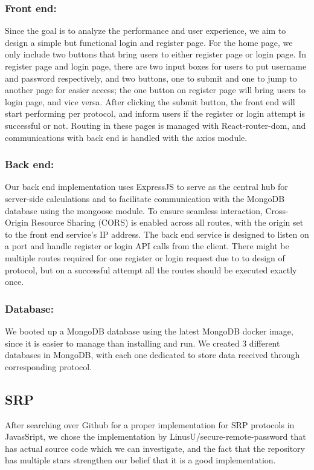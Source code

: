 \subsubsection{Front end:}
Since the goal is to analyze the performance and user experience, we aim to design a simple but functional login and register page. 
For the home page, we only include two buttons that bring users to either register page or login page.
In register page and login page, there are two input boxes for users to put username and password respectively, and two buttons, one to submit and one to jump to another page for easier access; the one button on register page will bring users to login page, and vice versa.
After clicking the submit button, the front end will start performing per protocol, and inform users if the register or login attempt is successful or not.
Routing in these pages is managed with React-router-dom, and communications with back end is handled with the axios module.

\subsubsection{Back end:}

Our back end implementation uses ExpressJS to serve as the central hub for server-side calculations and to facilitate communication with the MongoDB database using the mongoose module.
To ensure seamless interaction, Cross-Origin Resource Sharing (CORS) is enabled across all routes, with the origin set to the front end service's IP address. 
The back end service is designed to listen on a port and handle register or login API calls from the client. 
There might be multiple routes required for one register or login request due to to design of protocol, but on a successful attempt all the routes should be executed exactly once.

\subsubsection{Database:}
We booted up a MongoDB database using the latest MongoDB docker image, since it is easier to manage than installing and run. 
We created 3 different databases in MongoDB, with each one dedicated to store data received through corresponding protocol.

\subsection{SRP}
After searching over Github for a proper implementation for SRP protocols in JavasSript, we chose the implementation by LinusU/\newline secure-remote-password that has actual source code which we can investigate, and the fact that the repository has multiple stars strengthen our belief that it is a good implementation. 


